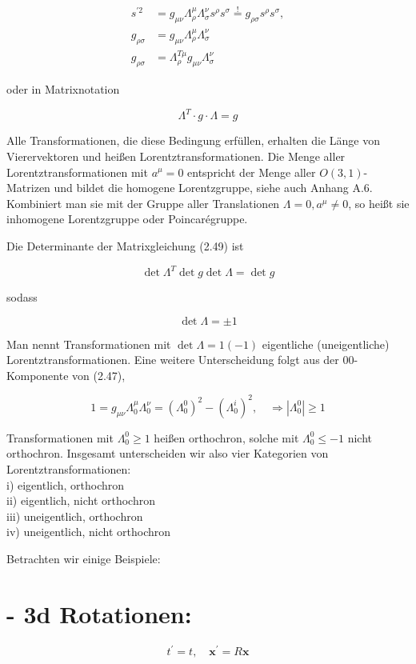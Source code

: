 \documentclass[10pt, letterpaper]{article}
\begin{document}
$$
\begin{aligned}
s^{\prime 2} & =g_{\mu \nu} \Lambda_{\rho}^{\mu} \Lambda_{\sigma}^{\nu} s^{\rho} s^{\sigma} \stackrel{!}{=} g_{\rho \sigma} s^{\rho} s^{\sigma}, \\
g_{\rho \sigma} & =g_{\mu \nu} \Lambda_{\rho}^{\mu} \Lambda_{\sigma}^{\nu} \\
g_{\rho \sigma} & =\Lambda_{\rho}^{T \mu} g_{\mu \nu} \Lambda_{\sigma}^{\nu}
\end{aligned}
$$

oder in Matrixnotation

$$
\Lambda^{T} \cdot g \cdot \Lambda=g
$$

Alle Transformationen, die diese Bedingung erfüllen, erhalten die Länge von Vierervektoren und heißen Lorentztransformationen. Die Menge aller Lorentztransformationen mit $a^{\mu}=0$ entspricht der Menge aller $O(3,1)$-Matrizen und bildet die homogene Lorentzgruppe, siehe auch Anhang A.6. Kombiniert man sie mit der Gruppe aller Translationen $\Lambda=0, a^{\mu} \neq 0$, so heißt sie inhomogene Lorentzgruppe oder Poincarégruppe.

Die Determinante der Matrixgleichung (2.49) ist

$$
\operatorname{det} \Lambda^{T} \operatorname{det} g \operatorname{det} \Lambda=\operatorname{det} g
$$

sodass

$$
\operatorname{det} \Lambda= \pm 1
$$

Man nennt Transformationen mit $\operatorname{det} \Lambda=1(-1)$ eigentliche (uneigentliche) Lorentztransformationen. Eine weitere Unterscheidung folgt aus der 00-Komponente von (2.47),

$$
1=g_{\mu \nu} \Lambda_{0}^{\mu} \Lambda_{0}^{\nu}=\left(\Lambda_{0}^{0}\right)^{2}-\left(\Lambda_{0}^{i}\right)^{2}, \quad \Rightarrow\left|\Lambda_{0}^{0}\right| \geqslant 1
$$

Transformationen mit $\Lambda_{0}^{0} \geqslant 1$ heißen orthochron, solche mit $\Lambda_{0}^{0} \leqslant-1$ nicht orthochron. Insgesamt unterscheiden wir also vier Kategorien von Lorentztransformationen:\\
i) eigentlich, orthochron\\
ii) eigentlich, nicht orthochron\\
iii) uneigentlich, orthochron\\
iv) uneigentlich, nicht orthochron

Betrachten wir einige Beispiele:

\section*{- 3d Rotationen:}
$$
t^{\prime}=t, \quad \mathbf{x}^{\prime}=R \mathbf{x}
$$
\end{document}

